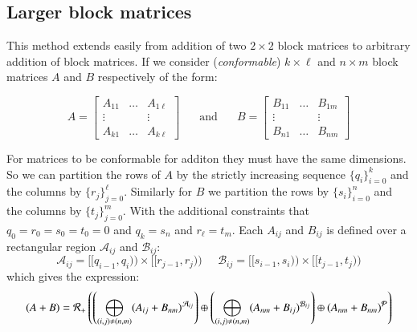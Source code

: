 \subsection{Larger block matrices}
This method extends easily from addition of two $2\times 2$ block matrices to arbitrary addition of block matrices.
If we consider (\emph{conformable}) $k \times \ell$ and $n \times m$ block matrices $A$ and $B$ respectively of the form:

\begin{equation*}
	A = \begin{bmatrix}
		A_{11} & \ldots & A_{1\ell}\\
		\vdots & & \vdots \\
		A_{k1} & \ldots & A_{k\ell}	
	\end{bmatrix}
	\;\;\;\;\;
	\text{ and }
	\;\;\;\;\;
	B = \begin{bmatrix}
		B_{11} & \ldots & B_{1m}\\
		\vdots & & \vdots \\
		B_{n1} & \ldots & B_{nm}	
	\end{bmatrix}
\end{equation*}

For matrices to be conformable for additon they must have the same dimensions.
So we can partition the rows of $A$ by the strictly increasing sequence $\{q_i\}_{i=0}^k$ and 
the columns by $\{r_j \}_{j=0}^\ell$.
Similarly for $B$ we partition the rows by $\{s_i\}_{i=0}^n$ and the columns by $\{t_j\}_{j=0}^m$.
With the additional constraints that ${q_0 = r_0 = s_0 = t_0 = 0}$ and $q_k = s_n$ and $r_\ell = t_m$.
Each $A_{ij}$ and $B_{ij}$ is defined over a rectangular region $\mathcal{A}_{ij}$ and $\mathcal{B}_{ij}$:
 \begin{equation*}
	\mathcal{A}_{ij} = [\![q_{i-1}, q_i )\!) \times [\![ r_{j-1}, r_{j} )\!)
	\;\;\;\;\;
	\mathcal{B}_{ij} = [\![s_{i-1}, s_i )\!) \times [\![ t_{j-1}, t_{j} )\!)
\end{equation*}
which gives the expression:
\begin{equation}
	(A+B) = \R[+] \left( 
		\left( \bigoplus_{(i,j) \neq (n,m)} (A_{ij} + B_{nm})^{\mathcal{A}_{ij}} \right) \oplus
		\left( \bigoplus_{(i,j) \neq (n,m)} (A_{nm} + B_{ij})^{\mathcal{B}_{ij}} \right) \oplus
			(A_{nm} + B_{nm})^{\mathcal{P}} 
	\right)
\end{equation}




%

